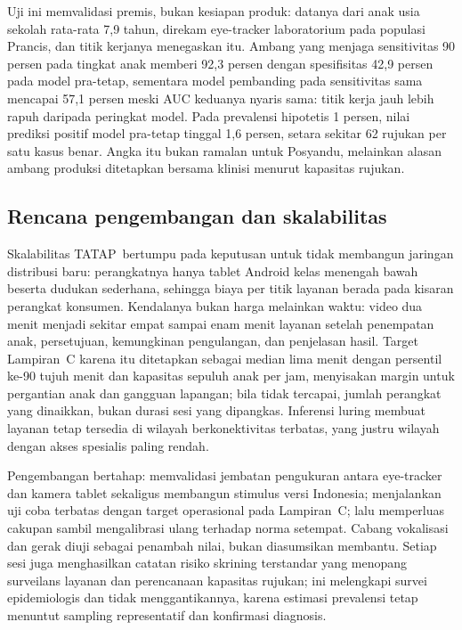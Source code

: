 \documentclass[10pt,letterpaper]{article}
\newcommand{\produk}{TATAP}
\begin{document}
Uji ini memvalidasi premis, bukan kesiapan produk: datanya dari anak usia sekolah rata-rata
7,9 tahun, direkam eye-tracker laboratorium pada populasi Prancis, dan titik kerjanya
menegaskan itu. Ambang yang menjaga sensitivitas 90 persen pada tingkat anak memberi 92,3
persen dengan spesifisitas 42,9 persen pada model pra-tetap, sementara model pembanding pada
sensitivitas sama mencapai 57,1 persen meski AUC keduanya nyaris sama: titik kerja jauh lebih
rapuh daripada peringkat model. Pada prevalensi hipotetis 1 persen, nilai prediksi positif
model pra-tetap tinggal 1,6 persen, setara sekitar 62 rujukan per satu kasus benar. Angka itu
bukan ramalan untuk Posyandu, melainkan alasan ambang produksi ditetapkan bersama klinisi
menurut kapasitas rujukan.

\subsection{Rencana pengembangan dan skalabilitas}

Skalabilitas \produk\ bertumpu pada keputusan untuk tidak membangun jaringan distribusi baru:
perangkatnya hanya tablet Android kelas menengah bawah beserta dudukan sederhana, sehingga
biaya per titik layanan berada pada kisaran perangkat konsumen. Kendalanya bukan harga
melainkan waktu: video dua menit menjadi sekitar empat sampai enam menit layanan setelah
penempatan anak, persetujuan, kemungkinan pengulangan, dan penjelasan hasil. Target
Lampiran~C karena itu ditetapkan sebagai median lima menit dengan persentil ke-90 tujuh menit
dan kapasitas sepuluh anak per jam, menyisakan margin untuk pergantian anak dan gangguan
lapangan; bila tidak tercapai, jumlah perangkat yang dinaikkan, bukan durasi sesi yang
dipangkas. Inferensi luring membuat layanan tetap tersedia di wilayah berkonektivitas
terbatas, yang justru wilayah dengan akses spesialis paling rendah.

Pengembangan bertahap: memvalidasi jembatan pengukuran antara eye-tracker dan kamera tablet
sekaligus membangun stimulus versi Indonesia; menjalankan uji coba terbatas dengan target
operasional pada Lampiran~C; lalu memperluas cakupan sambil mengalibrasi ulang terhadap norma
setempat. Cabang vokalisasi dan gerak diuji sebagai penambah nilai, bukan diasumsikan
membantu. Setiap sesi juga menghasilkan catatan risiko skrining terstandar yang menopang
surveilans layanan dan perencanaan kapasitas rujukan; ini melengkapi survei epidemiologis dan
tidak menggantikannya, karena estimasi prevalensi tetap menuntut sampling representatif dan
konfirmasi diagnosis.
\end{document}
